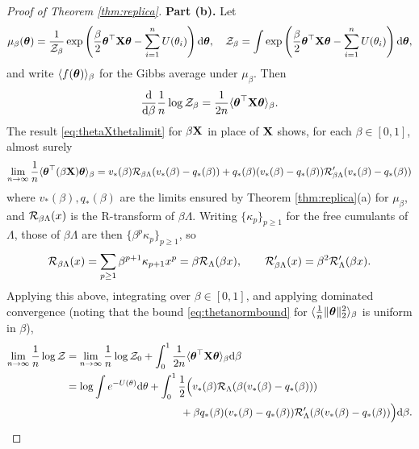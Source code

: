 \begin{proof}[Proof of Theorem \ref{thm:replica}]
{\bf Part (b).} Let
\[\mu_\beta(\boldsymbol{\theta})=\frac{1}{\mathcal{Z}_\beta}
\exp\left(\frac{\beta}{2}\boldsymbol{\theta}^\top \mathbf{X}\boldsymbol{\theta}
-\sum_{i=1}^n U(\theta_i)\right) \mathrm{d}\boldsymbol{\theta},
\quad \mathcal{Z}_\beta=\int \exp\left(
\frac{\beta}{2}\boldsymbol{\theta}^\top \mathbf{X}\boldsymbol{\theta}
-\sum_{i=1}^n U(\theta_i) \right) \mathrm{d} \boldsymbol{\theta},\]
and write $\langle f(\boldsymbol{\theta}) \rangle_\beta$ for the Gibbs average under
$\mu_\beta$. Then
\[\frac{\mathrm{d}}{\mathrm{d}\beta} \frac{1}{n}\log \mathcal{Z}_\beta
=\frac{1}{2n} \langle \boldsymbol{\theta}^\top \mathbf{X}\boldsymbol{\theta} \rangle_\beta.\]
The result \eqref{eq:thetaXthetalimit} for $\beta\mathbf{X}$ in place of $\mathbf{X}$ shows, for
each $\beta \in [0,1]$, almost surely
\[\lim_{n \to \infty}
\frac{1}{n}\langle \boldsymbol{\theta}^\top(\beta \mathbf{X})\boldsymbol{\theta} \rangle_\beta
=v_*(\beta)\mathcal{R}_{\beta\Lambda}(v_*(\beta)-q_*(\beta))+q_*(\beta)(v_*(\beta)-q_*(\beta))\mathcal{R}_{\beta\Lambda}'(v_*(\beta)-q_*(\beta))\]
where $v_*(\beta),q_*(\beta)$ are the limits ensured by Theorem
\ref{thm:replica}(a) for $\mu_\beta$,
and $\mathcal{R}_{\beta\Lambda}(x)$ is the R-transform of
$\beta\Lambda$. Writing $\{\kappa_p\}_{p \geq 1}$ for the free cumulants of
$\Lambda$, those of $\beta\Lambda$ are then $\{\beta^p \kappa_p\}_{p \geq 1}$,
so
\[\mathcal{R}_{\beta\Lambda}(x)=\sum_{p \geq 1} \beta^{p+1}\kappa_{p+1} x^{p}
=\beta \mathcal{R}_\Lambda(\beta x),
\qquad \mathcal{R}_{\beta\Lambda}'(x)=\beta^2 \mathcal{R}'_\Lambda(\beta x).\]
Applying this above, integrating over $\beta \in [0,1]$, and applying dominated
convergence (noting that the bound \eqref{eq:thetanormbound} for
$\langle \frac{1}{n}\|\boldsymbol{\theta}\|_2^2 \rangle_\beta$ is uniform in $\beta$),
\begin{align}
\lim_{n \to \infty} \frac{1}{n}\log \mathcal{Z}
&=\lim_{n \to \infty}\frac{1}{n}\log \mathcal{Z}_0
+\int_0^1 \frac{1}{2n}\langle \boldsymbol{\theta}^\top \mathbf{X}\boldsymbol{\theta} \rangle_\beta\mathrm{d} \beta\notag\\
&=\log \int e^{-U(\theta)}\mathrm{d}\theta+\int_0^1 \frac{1}{2}\Big(
v_*(\beta)\mathcal{R}_\Lambda(\beta(v_*(\beta)-q_*(\beta)))\notag\\
&\hspace{1.5in}+\beta
q_*(\beta)(v_*(\beta)-q_*(\beta))\mathcal{R}_\Lambda'(\beta(v_*(\beta)-q_*(\beta))\Big)\mathrm{d}\beta.\label{eq:integralfreeenergy}
\end{align}


\end{proof}
